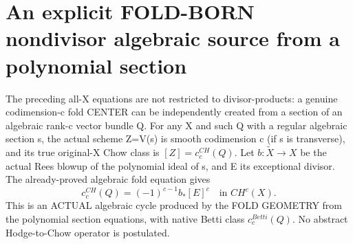 \documentclass[11pt]{article}
\begin{document}
\section{An explicit FOLD-BORN nondivisor algebraic source from a polynomial section}
The preceding all-X equations are not restricted
to divisor-products: a genuine codimension-c
fold CENTER can be independently created from
a section of an algebraic rank-c vector bundle Q.
For any X and such Q with a regular algebraic section s,
the actual scheme Z=V(s) is smooth codimension c
(if s is transverse), and its true original-X Chow
class is $[Z]=c_c^{CH}(Q)$.
Let $b:\widetilde X\to X$ be the actual Rees blowup of
the polynomial ideal of s, and E its exceptional divisor.
The already-proved algebraic fold equation gives
\[
 \boxed{
 c_c^{CH}(Q)=
 (-1)^{c-1}b_*[E]^c\quad\text{in }CH^c(X).
 }                                                       \tag{18}
\]
This is an ACTUAL algebraic cycle produced by the
FOLD GEOMETRY from the polynomial section equations,
with native Betti class $c_c^{Betti}(Q)$.
No abstract Hodge-to-Chow operator is postulated.
\end{document}
